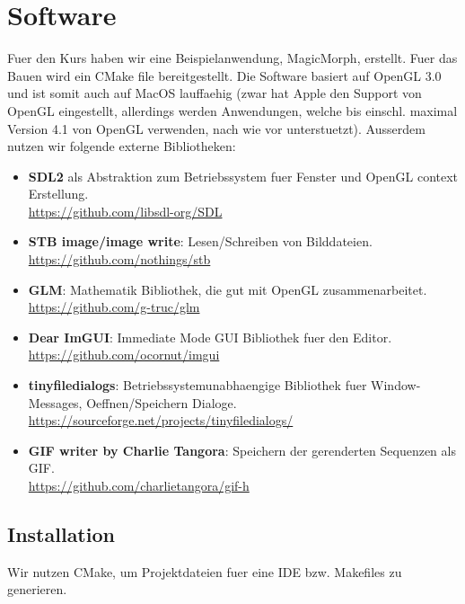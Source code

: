 \chapter{Software}

Fuer den Kurs haben wir eine Beispielanwendung, MagicMorph, erstellt.
Fuer das Bauen wird ein CMake file bereitgestellt. Die Software basiert
auf OpenGL 3.0 und ist somit auch auf MacOS lauffaehig (zwar hat Apple
den Support von OpenGL eingestellt, allerdings werden Anwendungen, welche bis
einschl. maximal Version 4.1 von OpenGL verwenden, nach wie vor unterstuetzt).
Ausserdem nutzen wir folgende externe Bibliotheken:

\begin{itemize}
	\item \textbf{SDL2} als Abstraktion zum Betriebssystem fuer Fenster und OpenGL context Erstellung.
	\\\href{https://github.com/libsdl-org/SDL}{https://github.com/libsdl-org/SDL} 
	\item \textbf{STB image/image write}: Lesen/Schreiben von Bilddateien.
		\\\href{https://github.com/nothings/stb}{https://github.com/nothings/stb} 
	\item \textbf{GLM}: Mathematik Bibliothek, die gut mit OpenGL zusammenarbeitet. 
			\\\href{https://github.com/g-truc/glm}{https://github.com/g-truc/glm}
	\item \textbf{Dear ImGUI}: Immediate Mode GUI Bibliothek fuer den Editor. 
	\\\href{https://github.com/ocornut/imgui}{https://github.com/ocornut/imgui}
	\item \textbf{tinyfiledialogs}: Betriebssystemunabhaengige Bibliothek fuer Window-Messages, Oeffnen/Speichern Dialoge. 		\\\href{https://sourceforge.net/projects/tinyfiledialogs/}{https://sourceforge.net/projects/tinyfiledialogs/}
	\item \textbf{GIF writer by Charlie Tangora}: Speichern der gerenderten Sequenzen als GIF.
				\\\href{https://github.com/charlietangora/gif-h}{https://github.com/charlietangora/gif-h} 
\end{itemize}

\section{Installation}

Wir nutzen CMake, um Projektdateien
fuer eine IDE bzw. Makefiles zu generieren. 

